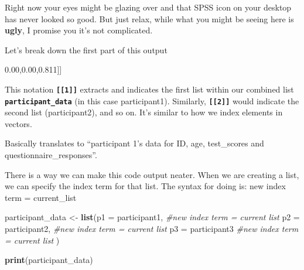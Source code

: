 \documentclass[
]{book}
\newenvironment{Shaded}{\begin{snugshade}}{\end{snugshade}}
\newcommand{\AttributeTok}[1]{\textcolor[rgb]{0.13,0.29,0.53}{#1}}
\newcommand{\CommentTok}[1]{\textcolor[rgb]{0.56,0.35,0.01}{\textit{#1}}}
\newcommand{\DecValTok}[1]{\textcolor[rgb]{0.00,0.00,0.81}{#1}}
\newcommand{\FunctionTok}[1]{\textcolor[rgb]{0.13,0.29,0.53}{\textbf{#1}}}
\newcommand{\NormalTok}[1]{#1}
\newcommand{\OtherTok}[1]{\textcolor[rgb]{0.56,0.35,0.01}{#1}}
\newcommand{\SpecialCharTok}[1]{\textcolor[rgb]{0.81,0.36,0.00}{\textbf{#1}}}
\begin{document}
Right now your eyes might be glazing over and that SPSS icon on your desktop has never looked so good. But just relax, while what you might be seeing here is \textbf{ugly}, I promise you it's not complicated.

Let's break down the first part of this output

\begin{Shaded}
\begin{Highlighting}[]
\NormalTok{[[}\DecValTok{1}\NormalTok{]]}
\end{Highlighting}
\end{Shaded}

This notation \textbf{\texttt{{[}{[}1{]}{]}}} extracts and indicates the first list within our combined list \textbf{\texttt{participant\_data}} (in this case participant1). Similarly, \textbf{\texttt{{[}{[}2{]}{]}}} would indicate the second list (participant2), and so on. It's similar to how we index elements in vectors.

\begin{Shaded}
\end{Shaded}

Basically translates to ``participant 1's data for ID, age, test\_scores and questionnaire\_responses''.

There is a way we can make this code output neater. When we are creating a list, we can specify the index term for that list. The syntax for doing is: new index term = current\_list

\begin{Shaded}
\begin{Highlighting}[]
\NormalTok{participant\_data }\OtherTok{\textless{}{-}} \FunctionTok{list}\NormalTok{(}\AttributeTok{p1 =}\NormalTok{ participant1, }\CommentTok{\#new index term = current list}
                         \AttributeTok{p2 =}\NormalTok{ participant2, }\CommentTok{\#new index term = current list}
                         \AttributeTok{p3 =}\NormalTok{ participant3 }\CommentTok{\#new index term = current list}
\NormalTok{                         )}

\FunctionTok{print}\NormalTok{(participant\_data)}
\end{Highlighting}
\end{Shaded}
\end{document}
